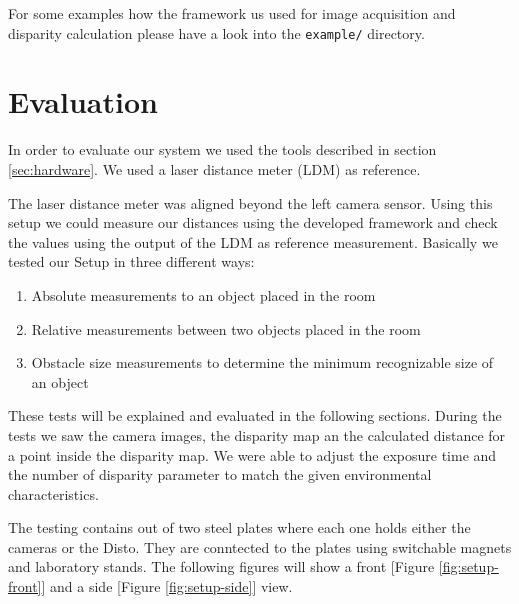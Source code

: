 \documentclass[11pt]{article}
\begin{document}
\bigskip
For some examples how the framework us used for image acquisition and disparity calculation please have a look into the \texttt{example/} directory. %


\section{Evaluation}
In order to evaluate our system we used the tools described in section \ref{sec:hardware}. We used a laser distance meter (LDM) as reference. 

The laser distance meter was aligned beyond the left camera sensor. Using this setup we could measure our distances using the developed framework and check the values using the output of the LDM as reference measurement. Basically we tested our Setup in three different ways:

\begin{enumerate}
  \item Absolute measurements to an object placed in the room
  \item Relative measurements between two objects placed in the room
  \item Obstacle size measurements to determine the minimum recognizable size of an object
\end{enumerate}

These tests will be explained and evaluated in the following sections. During the tests we saw the camera images, the disparity map an the calculated distance for a point inside the disparity map. We were able to adjust the exposure time and the number of disparity parameter to match the given environmental characteristics.

The testing contains out of two steel plates where each one holds either the cameras or the Disto. They are conntected to the plates using switchable magnets and laboratory stands. The following figures will show a front [Figure \ref{fig:setup-front}] and a side [Figure \ref{fig:setup-side}] view.
\end{document}
